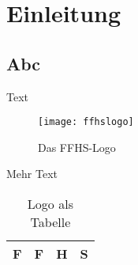 \chapter{Einleitung}
\section{Abc}

Text

\begin{figure}[ht]
  \begin{center}
  \texttt{[image: ffhslogo]}
  \end{center}
  \caption{Das FFHS-Logo}
\end{figure}


Mehr Text
 
\begin{table}[ht]
  \begin{center}
  \begin{tabular}{|c|c|c|c|}
  \hline
  F & F & H & S \\
  \hline
  \end{tabular}
  \end{center}
  \caption{Logo als Tabelle}
\end{table}